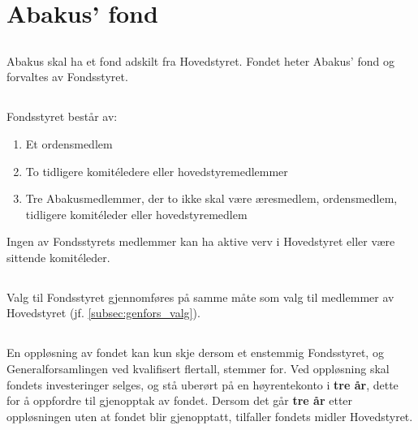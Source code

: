 \section{Abakus' fond}

\subsection{}
Abakus skal ha et fond adskilt fra Hovedstyret. Fondet heter Abakus’ fond og
forvaltes av Fondsstyret.

\subsection{}
Fondsstyret består av:
\begin{enumerate}[label=\alph*)]
    \item Et ordensmedlem
    \item To tidligere komitéledere eller hovedstyremedlemmer
    \item Tre Abakusmedlemmer, der to ikke skal være æresmedlem, ordensmedlem, tidligere komitéleder eller hovedstyremedlem
\end{enumerate}
Ingen av Fondsstyrets medlemmer kan ha aktive verv i Hovedstyret eller være sittende komitéleder. 

\subsection{}
Valg til Fondsstyret gjennomføres på samme måte som valg til medlemmer av Hovedstyret (jf. \ref{subsec:genfors_valg}).

\subsection{}
En oppløsning av fondet kan kun skje dersom et enstemmig Fondsstyret, og Generalforsamlingen ved kvalifisert flertall, 
stemmer for. Ved oppløsning skal fondets investeringer selges, og stå uberørt på en høyrentekonto i \textbf{tre år}, dette for å
oppfordre til gjenopptak av fondet. Dersom det går \textbf{tre år} etter oppløsningen uten at fondet blir gjenopptatt, 
tilfaller fondets midler Hovedstyret.

